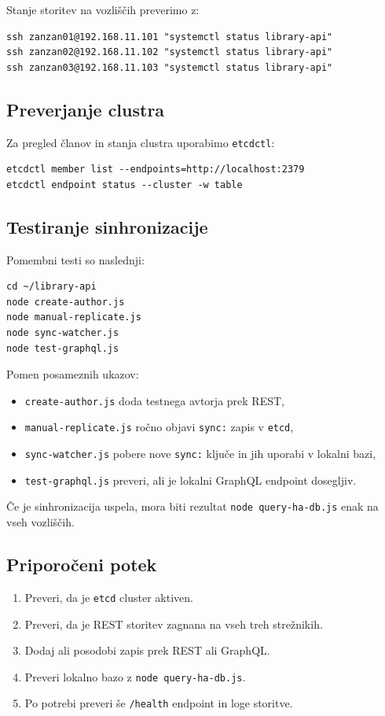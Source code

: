 \documentclass[a4paper,11pt]{article}
\begin{document}
Stanje storitev na vozliščih preverimo z:

\begin{lstlisting}
ssh zanzan01@192.168.11.101 "systemctl status library-api"
ssh zanzan02@192.168.11.102 "systemctl status library-api"
ssh zanzan03@192.168.11.103 "systemctl status library-api"
\end{lstlisting}

\subsection{Preverjanje clustra}
Za pregled članov in stanja clustra uporabimo \texttt{etcdctl}:

\begin{lstlisting}
etcdctl member list --endpoints=http://localhost:2379
etcdctl endpoint status --cluster -w table
\end{lstlisting}

\subsection{Testiranje sinhronizacije}
Pomembni testi so naslednji:

\begin{lstlisting}
cd ~/library-api
node create-author.js
node manual-replicate.js
node sync-watcher.js
node test-graphql.js
\end{lstlisting}

Pomen posameznih ukazov:
\begin{itemize}
  \item \texttt{create-author.js} doda testnega avtorja prek REST,
  \item \texttt{manual-replicate.js} ročno objavi \texttt{sync:} zapis v \texttt{etcd},
  \item \texttt{sync-watcher.js} pobere nove \texttt{sync:} ključe in jih uporabi v lokalni bazi,
  \item \texttt{test-graphql.js} preveri, ali je lokalni GraphQL endpoint dosegljiv.
\end{itemize}

Če je sinhronizacija uspela, mora biti rezultat \texttt{node query-ha-db.js} enak na vseh vozliščih.

\subsection{Priporočeni potek}
\begin{enumerate}
  \item Preveri, da je \texttt{etcd} cluster aktiven.
  \item Preveri, da je REST storitev zagnana na vseh treh strežnikih.
  \item Dodaj ali posodobi zapis prek REST ali GraphQL.
  \item Preveri lokalno bazo z \texttt{node query-ha-db.js}.
  \item Po potrebi preveri še \texttt{/health} endpoint in loge storitve.
\end{enumerate}
\end{document}
